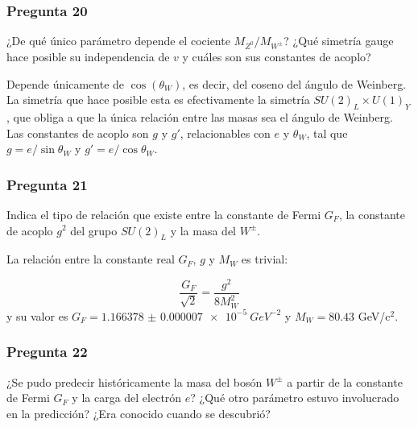 \begin{Enunciado}
	\subsubsection*{Pregunta 20}

	¿De qué único parámetro depende el cociente $M_{Z^0}/M_{W^\pm}$? ¿Qué simetría gauge hace posible su independencia de $v$ y cuáles son sus constantes de acoplo?

\end{Enunciado}

Depende únicamente de $\cos (\theta_W)$, es decir, del coseno del ángulo de Weinberg. La simetría que hace posible esta es efectivamente la simetría $SU(2)_L \times U(1)_Y$, que obliga a que la única relación entre las masas sea el ángulo de Weinberg. Las constantes de acoplo son $g$ y $g'$, relacionables con $e$ y $\theta_W$, tal que $g=e/\sin \theta_W$ y $g'=e/\cos \theta_W$.

\vspace*{2em}

\begin{Enunciado}
	\subsubsection*{Pregunta 21}

	Indica el tipo de relación que existe entre la constante de Fermi $G_F$, la constante de acoplo $g^2$ del grupo $SU(2)_L$ y la masa del $W^\pm$.

\end{Enunciado}

La relación entre la constante real $G_F$, $g$ y $M_W$ es trivial:

\begin{equation}
	\frac{G_F}{\sqrt{2}} = \frac{g^2}{8M_W^2}
\end{equation}
y su valor es $G_F=\SI{1.166378(7)e-5}{GeV^{-2}}$ y $M_W=80.43$ GeV/c$^2$.

\vspace*{2em}

\begin{Enunciado}
	\subsubsection*{Pregunta 22}

	¿Se pudo predecir históricamente la masa del bosón $W^\pm$ a partir de la constante de Fermi $G_F$ y la carga del electrón $e$? ¿Qué otro parámetro estuvo involucrado en la predicción? ¿Era conocido cuando se descubrió?

\end{Enunciado}


